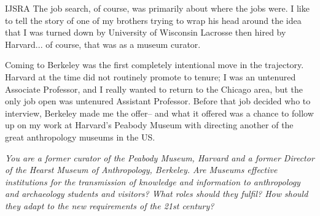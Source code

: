 \begin{labeling}{IJSRA}
The job search, of course, was primarily about where the jobs were. I like to tell the story of one of my brothers trying to wrap his head around the idea that I was turned down by University of Wisconsin Lacrosse then hired by Harvard... of course, that was as a museum curator. 

Coming to Berkeley was the first completely intentional move in the trajectory. Harvard at the time did not routinely promote to tenure; I was an untenured Associate Professor, and I really wanted to return to the Chicago area, but the only job open was untenured Assistant Professor. Before that job decided who to interview, Berkeley made me the offer-- and what it offered was a chance to follow up on my work at Harvard's Peabody Museum with directing another of the great anthropology museums in the US.
	
\item[IJSRA] \textit{You are a former curator of the Peabody Museum, Harvard and a former Director of the Hearst Museum of Anthropology, Berkeley. Are Museums effective institutions for the transmission of knowledge and information to anthropology and archaeology students and visitors? What roles should they fulfil? How should they adapt to the new requirements of the 21st century?}


\end{labeling}
